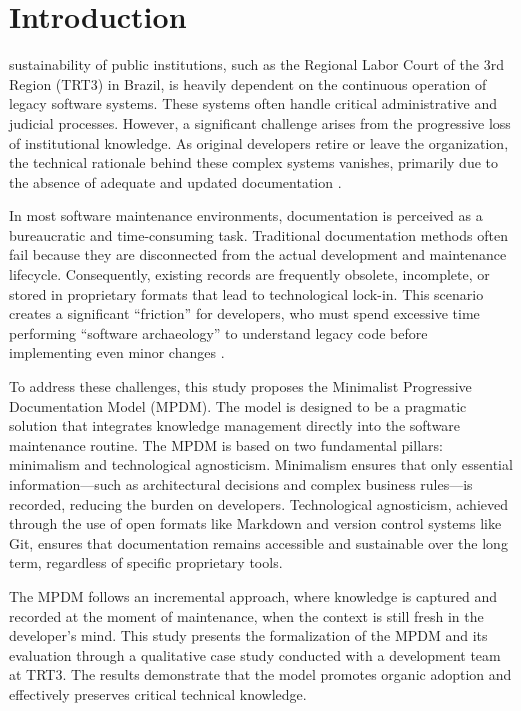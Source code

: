\documentclass{ieeeaccess}
\begin{document}
\titlepgskip=-21pt

\maketitle

\section{Introduction}
\label{sec:introduction}

 sustainability of public institutions, such as the Regional Labor Court of the 3rd Region (TRT3) in Brazil, is heavily dependent on the continuous operation of legacy software systems. These systems often handle critical administrative and judicial processes. However, a significant challenge arises from the progressive loss of institutional knowledge. As original developers retire or leave the organization, the technical rationale behind these complex systems vanishes, primarily due to the absence of adequate and updated documentation \cite{sommerville}.

In most software maintenance environments, documentation is perceived as a bureaucratic and time-consuming task. Traditional documentation methods often fail because they are disconnected from the actual development and maintenance lifecycle. Consequently, existing records are frequently obsolete, incomplete, or stored in proprietary formats that lead to technological lock-in. This scenario creates a significant ``friction'' for developers, who must spend excessive time performing ``software archaeology'' to understand legacy code before implementing even minor changes \cite{garousi}.

To address these challenges, this study proposes the Minimalist Progressive Documentation Model (MPDM). The model is designed to be a pragmatic solution that integrates knowledge management directly into the software maintenance routine. The MPDM is based on two fundamental pillars: minimalism and technological agnosticism. Minimalism ensures that only essential information—such as architectural decisions and complex business rules—is recorded, reducing the burden on developers. Technological agnosticism, achieved through the use of open formats like Markdown and version control systems like Git, ensures that documentation remains accessible and sustainable over the long term, regardless of specific proprietary tools.

The MPDM follows an incremental approach, where knowledge is captured and recorded at the moment of maintenance, when the context is still fresh in the developer's mind. This study presents the formalization of the MPDM and its evaluation through a qualitative case study conducted with a development team at TRT3. The results demonstrate that the model promotes organic adoption and effectively preserves critical technical knowledge.
\end{document}
